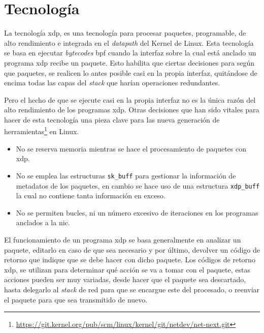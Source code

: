 \section{Tecnología }
\label{TecnologiaXDP}

La tecnología \gls{xdp}, es una tecnología para procesar paquetes, programable, de alto rendimiento e integrada en el \textit{datapath} del Kernel de Linux. Esta tecnología se basa en ejecutar \textit{bytecodes} \gls{bpf} cuando la interfaz sobre la cual está anclado un programa \gls{xdp} recibe un paquete. Esto habilita que ciertas decisiones para según que paquetes, se realicen lo antes posible casi en la propia interfaz, quitándose de encima todas las capas del \textit{stack} que harían operaciones redundantes.\\
\par

Pero el hecho de que se ejecute casi en la propia interfaz no es la única razón del alto rendimiento de los programas \gls{xdp}. Otras decisiones que han sido vitales para hacer de esta tecnología una pieza clave para las nueva generación de herramientas\footnote{\url{https://git.kernel.org/pub/scm/linux/kernel/git/netdev/net-next.git}} en Linux.

\begin{itemize}
    \item No se reserva memoria mientras se hace el procesamiento de paquetes con \gls{xdp}.
    \item No se emplea las estructuras \texttt{sk\_buff} para gestionar la información de metadatos de los paquetes, en cambio se hace uso de una estructura \texttt{xdp\_buff} la cual no contiene tanta información en exceso. 
    \item No se permiten bucles, ni un número excesivo de iteraciones en los programas anclados a la \gls{nic}.
    
\end{itemize}


\par

El funcionamiento de un programa \gls{xdp} se basa generalmente en analizar un paquete, editarlo en caso de que sea necesario y por último, devolver un código de retorno que indique que se debe hacer con dicho paquete. Los códigos de retorno \gls{xdp}, se utilizan para determinar qué acción se va a tomar con el paquete, estas acciones pueden ser muy variadas, desde hacer que el paquete sea descartado, hasta delegarlo al \textit{stack} de red para que se encargue este del procesado, o reenviar el paquete para que sea transmitido de nuevo. \\
\par

